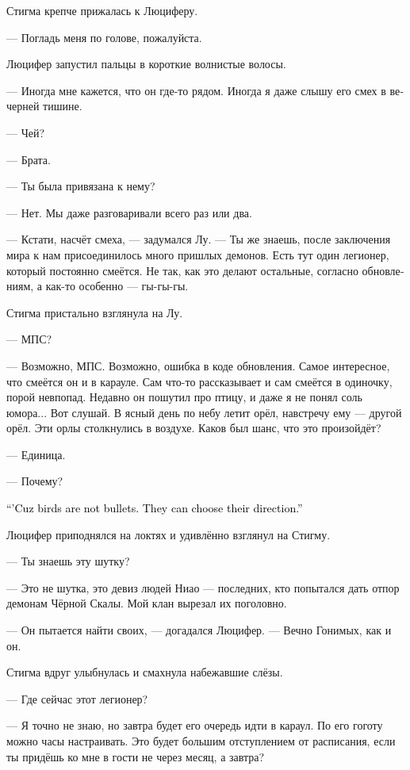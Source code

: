 \documentclass[a4paper,12pt,fleqn]{book}\usepackage{cooltooltips}\usepackage{polyglossia}\setdefaultlanguage[babelshorthands=true]{russian}\setotherlanguage{english}\defaultfontfeatures{Ligatures=TeX,Mapping=tex-text} \usepackage{xcolor}\definecolor{lightgray}{HTML}{bbbbbb}\color{lightgray}\newcommand{\ml}[3]{\textenglish{\textcolor{black}{#3}}}
\begin{document}
{Стигма крепче прижалась к Люциферу.

--- Погладь меня по голове, пожалуйста.

Люцифер запустил пальцы в короткие волнистые волосы.

--- Иногда мне кажется, что он где-то рядом.
Иногда я даже слышу его смех в вечерней тишине.

--- Чей?

--- Брата.

--- Ты была привязана к нему?

--- Нет.
Мы даже разговаривали всего раз или два.

--- Кстати, насчёт смеха, --- задумался Лу.
--- Ты же знаешь, после заключения мира к нам присоединилось много пришлых демонов.
Есть тут один легионер, который постоянно смеётся.
Не так, как это делают остальные, согласно обновлениям, а как-то особенно --- гы-гы-гы.

Стигма пристально взглянула на Лу.

--- МПС?

--- Возможно, МПС.
Возможно, ошибка в коде обновления.
Самое интересное, что смеётся он и в карауле.
Сам что-то рассказывает и сам смеётся в одиночку, порой невпопад.
Недавно он пошутил про птицу, и даже я не понял соль юмора...
Вот слушай.
В ясный день по небу летит орёл, навстречу ему --- другой орёл.
Эти орлы столкнулись в воздухе.
Каков был шанс, что это произойдёт?

--- Единица.

--- Почему?

\ml{$0$}
{--- Потому что птицы не пули.}
{``'Cuz birds are not bullets.}
\ml{$0$}
{Они сами решают, куда лететь.}
{They can choose their direction.''}

Люцифер приподнялся на локтях и удивлённо взглянул на Стигму.

--- Ты знаешь эту шутку?

--- Это не шутка, это девиз людей Ниао --- последних, кто попытался дать отпор демонам Чёрной Скалы.
Мой клан вырезал их поголовно.

--- Он пытается найти своих, --- догадался Люцифер.
--- Вечно Гонимых, как и он.

Стигма вдруг улыбнулась и смахнула набежавшие слёзы.

--- Где сейчас этот легионер?

--- Я точно не знаю, но завтра будет его очередь идти в караул.
По его гоготу можно часы настраивать.
Это будет большим отступлением от расписания, если ты придёшь ко мне в гости не через месяц, а завтра?

}
\end{document}
